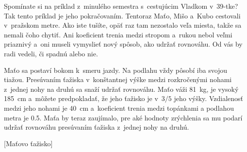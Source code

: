 Spomínate si na príklad z~minulého semestra s~cestujúcim Vladkom v~39-tke? Tak tento príklad je jeho pokračovaním.
Tentoraz Maťo, Mišo a~Kubo cestovali v~pražskom metre. Ako iste tušíte, opäť raz tam nezostalo veľa miesta, takže sa nemali čoho chytiť.
Ani koeficient trenia medzi stropom a~rukou nebol veľmi priaznivý a~oni museli vymyslieť nový spôsob, ako udržať rovnováhu.
Od vás by radi vedeli, či spadnú alebo nie.

Maťo sa postaví bokom k~smeru jazdy. Na podlahu vždy pôsobí iba svojou tiažou.
Presúvaním ťažiska v~konštantnej výške medzi rozkročenými nohami z~jednej nohy na druhú sa snaží udržať rovnováhu.
Maťo váži \SI{81}{\kilo\gram}, je vysoký \SI{185}{\centi\metre} a~môžete predpokladať, že jeho ťažisko je v~$3/5$ jeho výšky.
Vzdialenosť medzi jeho nohami je \SI{40}{\centi\metre} a~koeficient trenia medzi topánkami a podlahou metra je \num{0.5}.
Maťa by teraz zaujímalo, pre aké hodnoty zrýchlenia sa mu podarí udržať rovnováhu presúvaním ťažiska z~jednej nohy na druhú.

[Maťovo ťažisko]